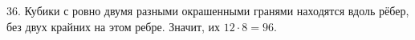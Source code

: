 36. Кубики с ровно двумя разными окрашенными гранями находятся вдоль рёбер, без двух крайних на этом ребре. Значит, их $12\cdot8=96.$\\
